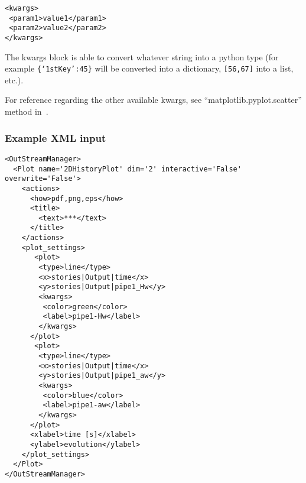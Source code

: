 \begin{itemize}
\begin{lstlisting}[style=XML]
<kwargs>
 <param1>value1</param1>
 <param2>value2</param2>
</kwargs>
\end{lstlisting}

  The kwargs block is able to convert whatever string into a python type (for
  example  \texttt{\{`1stKey':45\}} will
  be converted into a dictionary,
   \texttt{[56,67]}  into a list, etc.).

  For reference regarding the other available kwargs, see
  ``matplotlib.pyplot.scatter'' method in~\cite{MatPlotLib}.
\end{itemize}



\subsubsection{Example XML input}
\begin{lstlisting}[style=XML,morekeywords={name,dim,interactive,overwrite}]
<OutStreamManager>
  <Plot name='2DHistoryPlot' dim='2' interactive='False' overwrite='False'>
    <actions>
      <how>pdf,png,eps</how>
      <title>
        <text>***</text>
      </title>
    </actions>
    <plot_settings>
       <plot>
        <type>line</type>
        <x>stories|Output|time</x>
        <y>stories|Output|pipe1_Hw</y>
        <kwargs>
         <color>green</color>
         <label>pipe1-Hw</label>
        </kwargs>
      </plot>
       <plot>
        <type>line</type>
        <x>stories|Output|time</x>
        <y>stories|Output|pipe1_aw</y>
        <kwargs>
         <color>blue</color>
         <label>pipe1-aw</label>
        </kwargs>
      </plot>
      <xlabel>time [s]</xlabel>
      <ylabel>evolution</ylabel>
    </plot_settings>
  </Plot>
</OutStreamManager>
\end{lstlisting}
